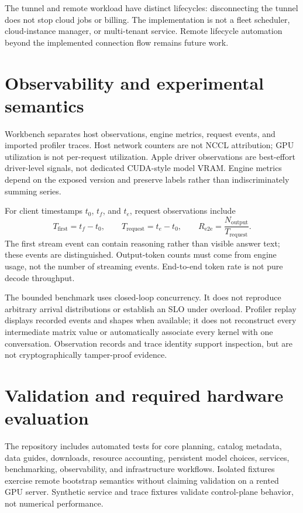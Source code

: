 \documentclass[10pt]{article}
\begin{document}
The tunnel and remote workload have distinct lifecycles: disconnecting the tunnel does not stop cloud jobs or billing. The implementation is not a fleet scheduler, cloud-instance manager, or multi-tenant service. Remote lifecycle automation beyond the implemented connection flow remains future work.

\section{Observability and experimental semantics}
Workbench separates host observations, engine metrics, request events, and imported profiler traces. Host network counters are not NCCL attribution; GPU utilization is not per-request utilization. Apple driver observations are best-effort driver-level signals, not dedicated CUDA-style model VRAM. Engine metrics depend on the exposed version and preserve labels rather than indiscriminately summing series.

For client timestamps $t_0$, $t_f$, and $t_e$, request observations include
\begin{equation}
T_{\mathrm{first}}=t_f-t_0,\qquad
T_{\mathrm{request}}=t_e-t_0,\qquad
R_{\mathrm{e2e}}=\frac{N_{\mathrm{output}}}{T_{\mathrm{request}}}.
\end{equation}
The first stream event can contain reasoning rather than visible answer text; these events are distinguished. Output-token counts must come from engine usage, not the number of streaming events. End-to-end token rate is not pure decode throughput.

The bounded benchmark uses closed-loop concurrency. It does not reproduce arbitrary arrival distributions or establish an SLO under overload. Profiler replay displays recorded events and shapes when available; it does not reconstruct every intermediate matrix value or automatically associate every kernel with one conversation. Observation records and trace identity support inspection, but are not cryptographically tamper-proof evidence.

\section{Validation and required hardware evaluation}
The repository includes automated tests for core planning, catalog metadata, data guides, downloads, resource accounting, persistent model choices, services, benchmarking, observability, and infrastructure workflows. Isolated fixtures exercise remote bootstrap semantics without claiming validation on a rented GPU server. Synthetic service and trace fixtures validate control-plane behavior, not numerical performance.
\end{document}
